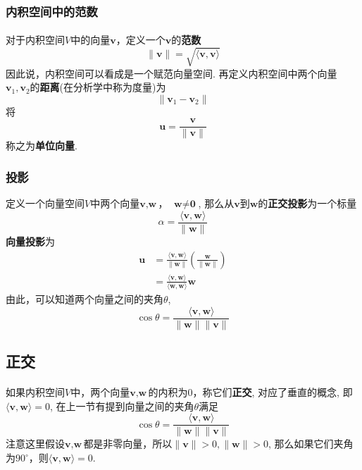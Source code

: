\subsubsection{内积空间中的范数}
\paragraph{}
对于内积空间$V$中的向量$\textbf{v}$，定义一个$\textbf{v}$的\textbf{范数}
$$
\parallel \textbf{v} \parallel = \sqrt{\langle \textbf{v} , \textbf{v} \rangle}
$$
因此说，内积空间可以看成是一个赋范向量空间. 再定义内积空间中两个向量$\textbf{v}_1, \textbf{v}_2$的\textbf{距离}(在分析学中称为度量)为
$$
\parallel \textbf{v}_1 - \textbf{v}_2 \parallel 
$$
将
$$
\textbf{u} = \frac{\textbf{v}}{\parallel \textbf{v} \parallel}
$$
称之为\textbf{单位向量}.


\subsubsection{投影}
定义一个向量空间$V$中两个向量$\textbf{v}, \textbf{w}$， $\textbf{w} \neq \textbf{0}$, 那么从$\textbf{v}$到$\textbf{w}$的\textbf{正交投影}为一个标量
$$
\alpha = \frac{\langle \textbf{v}, \textbf{w} \rangle  }{\parallel \textbf{w} \parallel }
$$
\textbf{向量投影}为
\begin{align*}
\textbf{u} & =  \frac{\langle \textbf{v}, \textbf{w} \rangle  }{\parallel \textbf{w} \parallel } (\frac{\textbf{w}}{\parallel \textbf{w} \parallel}) \\
                 & = \frac{\langle \textbf{v}, \textbf{w}\rangle}{\langle \textbf{w}, \textbf{w} \rangle} \textbf{w}
\end{align*}
由此，可以知道两个向量之间的夹角$\theta$, 
$$
\cos{\theta} =   \frac{\langle \textbf{v}, \textbf{w} \rangle  }{\parallel \textbf{w} \parallel \parallel \textbf{v} \parallel}
$$

\subsection{正交}
\paragraph{}
如果内积空间$V$中，两个向量$\textbf{v}, \textbf{w}$的内积为0，称它们\textbf{正交}, 对应了垂直的概念, 即$\langle \textbf{v}, \textbf{w} \rangle = 0$, 在上一节有提到向量之间的夹角$\theta$满足
$$
\cos{\theta} =  \frac{\langle \textbf{v}, \textbf{w} \rangle  }{\parallel \textbf{w} \parallel \parallel \textbf{v} \parallel}
$$
注意这里假设$\textbf{v}, \textbf{w}$都是非零向量，所以$\parallel \textbf{v} \parallel > 0, \parallel \textbf{w} \parallel > 0 $,  那么如果它们夹角为$90^\circ$，则$\langle \textbf{v}, \textbf{w} \rangle = 0$.

